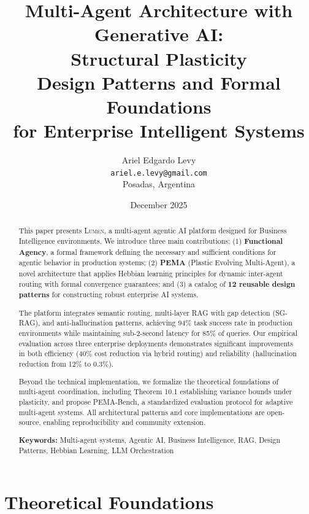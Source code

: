 \documentclass[11pt,a4paper]{article}
\title{\textbf{Multi-Agent Architecture with Generative AI:\\Structural Plasticity}\\[0.5em]
\large Design Patterns and Formal Foundations\\for Enterprise Intelligent Systems}
\author{
    Ariel Edgardo Levy\\
    \texttt{ariel.e.levy@gmail.com}\\
    Posadas, Argentina
}
\date{December 2025}
\theoremstyle{definition}
\theoremstyle{remark}
\newcommand{\lumen}{\textsc{Lumen}\xspace}
\newcommand{\pema}{\textsc{PEMA}\xspace}
\newcommand{\sgrag}{\textsc{SG-RAG}\xspace}
\begin{document}
\maketitle


\begin{abstract}
This paper presents \lumen, a multi-agent agentic AI platform designed for Business Intelligence environments. We introduce three main contributions: (1) \textbf{Functional Agency}, a formal framework defining the necessary and sufficient conditions for agentic behavior in production systems; (2) \textbf{\pema} (Plastic Evolving Multi-Agent), a novel architecture that applies Hebbian learning principles for dynamic inter-agent routing with formal convergence guarantees; and (3) a catalog of \textbf{12 reusable design patterns} for constructing robust enterprise AI systems.

The platform integrates semantic routing, multi-layer RAG with gap detection (\sgrag), and anti-hallucination patterns, achieving 94\% task success rate in production environments while maintaining sub-2-second latency for 85\% of queries. Our empirical evaluation across three enterprise deployments demonstrates significant improvements in both efficiency (40\% cost reduction via hybrid routing) and reliability (hallucination reduction from 12\% to 0.3\%).

Beyond the technical implementation, we formalize the theoretical foundations of multi-agent coordination, including Theorem 10.1 establishing variance bounds under plasticity, and propose PEMA-Bench, a standardized evaluation protocol for adaptive multi-agent systems. All architectural patterns and core implementations are open-source, enabling reproducibility and community extension.

\vspace{0.5em}
\noindent\textbf{Keywords:} Multi-agent systems, Agentic AI, Business Intelligence, RAG, Design Patterns, Hebbian Learning, LLM Orchestration
\end{abstract}

\newpage


\part{Theoretical Foundations}
\end{document}
